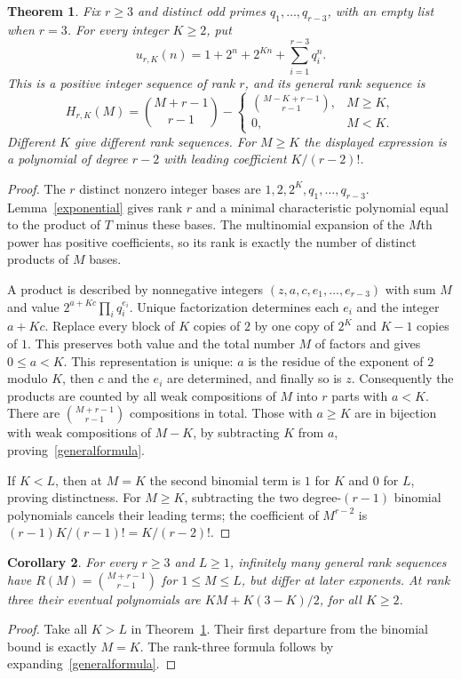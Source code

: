 \documentclass[11pt]{article}
\newtheorem{theorem}{Theorem}
\newtheorem{corollary}[theorem]{Corollary}
\begin{document}
\begin{theorem}\label{general}
Fix $r\geq3$ and distinct odd primes $q_1,\ldots,q_{r-3}$, with an empty
list when $r=3$. For every integer $K\geq2$, put
\[
 u_{r,K}(n)=1+2^n+2^{Kn}+\sum_{i=1}^{r-3}q_i^n.
\]
This is a positive integer sequence of rank $r$, and its general rank
sequence is
\begin{equation}\label{generalformula}
 H_{r,K}(M)=\binom{M+r-1}{r-1}-
 \begin{cases}\binom{M-K+r-1}{r-1},&M\geq K,\\0,&M<K.\end{cases}
\end{equation}
Different $K$ give different rank sequences. For $M\geq K$ the displayed
expression is a polynomial of degree $r-2$ with leading coefficient
$K/(r-2)!$.
\end{theorem}
\begin{proof}
The $r$ distinct nonzero integer bases are $1,2,2^K,q_1,\ldots,q_{r-3}$.
Lemma~\ref{exponential} gives rank $r$ and a minimal characteristic
polynomial equal to the product of $T$ minus these bases.
The multinomial expansion of the $M$th power has positive coefficients,
so its rank is exactly the number of distinct products of $M$ bases.

A product is described by nonnegative integers
$(z,a,c,e_1,\ldots,e_{r-3})$ with sum $M$ and value
$2^{a+Kc}\prod_iq_i^{e_i}$. Unique factorization determines each $e_i$
and the integer $a+Kc$. Replace every block of $K$ copies of $2$ by one
copy of $2^K$ and $K-1$ copies of $1$. This preserves both value and
the total number $M$ of factors and gives $0\leq a<K$.
This representation is unique: $a$ is the residue of the exponent of $2$
modulo $K$, then $c$ and the $e_i$ are determined, and finally so is $z$.
Consequently the products are counted by all weak compositions of $M$
into $r$ parts with $a<K$. There are $\binom{M+r-1}{r-1}$ compositions
in total. Those with $a\geq K$ are in bijection with weak compositions
of $M-K$, by subtracting $K$ from $a$, proving~\eqref{generalformula}.

If $K<L$, then at $M=K$ the second binomial term is $1$ for $K$ and
$0$ for $L$, proving distinctness. For $M\geq K$, subtracting the
two degree-$(r-1)$ binomial polynomials cancels their leading terms;
the coefficient of $M^{r-2}$ is $(r-1)K/(r-1)!=K/(r-2)!$.
\end{proof}

\begin{corollary}\label{maxprefix}
For every $r\geq3$ and $L\geq1$, infinitely many general rank sequences
have $R(M)=\binom{M+r-1}{r-1}$ for $1\leq M\leq L$, but differ at
later exponents. At rank three their eventual polynomials are
$KM+K(3-K)/2$, for all $K\geq2$.
\end{corollary}
\begin{proof}
Take all $K>L$ in Theorem~\ref{general}. Their first departure from the
binomial bound is exactly $M=K$. The rank-three formula follows by
expanding~\eqref{generalformula}.
\end{proof}
\end{document}
